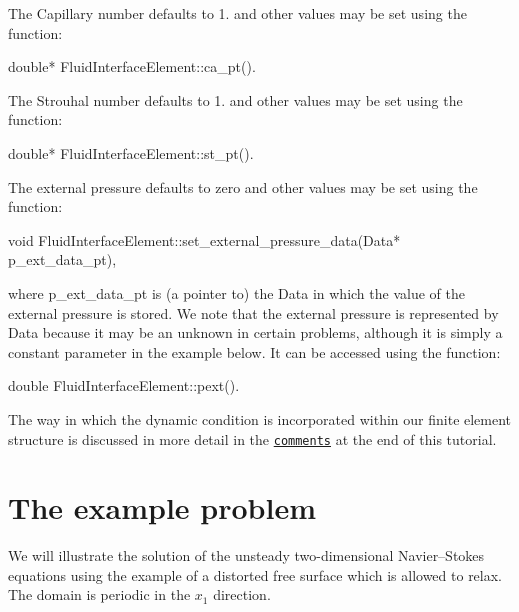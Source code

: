 The Capillary number defaults to 1. and other values may be set using the function\+:


\begin{DoxyCode}
\textcolor{keywordtype}{double}* FluidInterfaceElement::ca\_pt().
\end{DoxyCode}


The Strouhal number defaults to 1. and other values may be set using the function\+:


\begin{DoxyCode}
\textcolor{keywordtype}{double}* FluidInterfaceElement::st\_pt().
\end{DoxyCode}


The external pressure defaults to zero and other values may be set using the function\+:


\begin{DoxyCode}
\textcolor{keywordtype}{void} FluidInterfaceElement::set\_external\_pressure\_data(Data* p\_ext\_data\_pt),
\end{DoxyCode}


where {\ttfamily p\+\_\+ext\+\_\+data\+\_\+pt} is (a pointer to) the {\ttfamily Data} in which the value of the external pressure is stored. We note that the external pressure is represented by {\ttfamily Data} because it may be an unknown in certain problems, although it is simply a constant parameter in the example below. It can be accessed using the function\+:


\begin{DoxyCode}
\textcolor{keywordtype}{double} FluidInterfaceElement::pext().
\end{DoxyCode}


The way in which the dynamic condition is incorporated within our finite element structure is discussed in more detail in the \href{#application_of_dbc}{\tt comments} at the end of this tutorial.



 

\hypertarget{index_example_problem}{}\section{The example problem}\label{index_example_problem}
We will illustrate the solution of the unsteady two-\/dimensional Navier--Stokes equations using the example of a distorted free surface which is allowed to relax. The domain is periodic in the $ x_1 $ direction.

